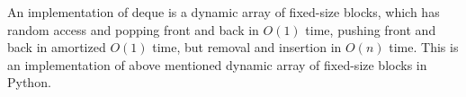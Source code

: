 \documentclass[a4paper,12pt]{article}
\begin{document}
An implementation of deque is a dynamic array of fixed-size blocks, which has random access and popping front and back in $O(1)$ time, pushing front and back in amortized $O(1)$ time, but removal and insertion in $O(n)$ time.
This is an implementation of above mentioned dynamic array of fixed-size blocks in Python.

\end{document}
